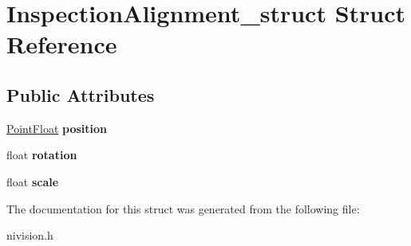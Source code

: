 \hypertarget{structInspectionAlignment__struct}{
\section{InspectionAlignment\_\-struct Struct Reference}
\label{structInspectionAlignment__struct}
}
\subsection*{Public Attributes}
\begin{DoxyCompactItemize}
\item 
\hypertarget{structInspectionAlignment__struct_a27c10fafcca053eacdabaef800811bf9}{
\hyperlink{structPointFloat__struct}{PointFloat} {\bfseries position}}
\label{structInspectionAlignment__struct_a27c10fafcca053eacdabaef800811bf9}

\item 
\hypertarget{structInspectionAlignment__struct_abb0263eeda30199299e9cea8e687126f}{
float {\bfseries rotation}}
\label{structInspectionAlignment__struct_abb0263eeda30199299e9cea8e687126f}

\item 
\hypertarget{structInspectionAlignment__struct_a0bb26230fab73bd3d8c8745ca8b94e61}{
float {\bfseries scale}}
\label{structInspectionAlignment__struct_a0bb26230fab73bd3d8c8745ca8b94e61}

\end{DoxyCompactItemize}


The documentation for this struct was generated from the following file:\begin{DoxyCompactItemize}
\item 
nivision.h\end{DoxyCompactItemize}
